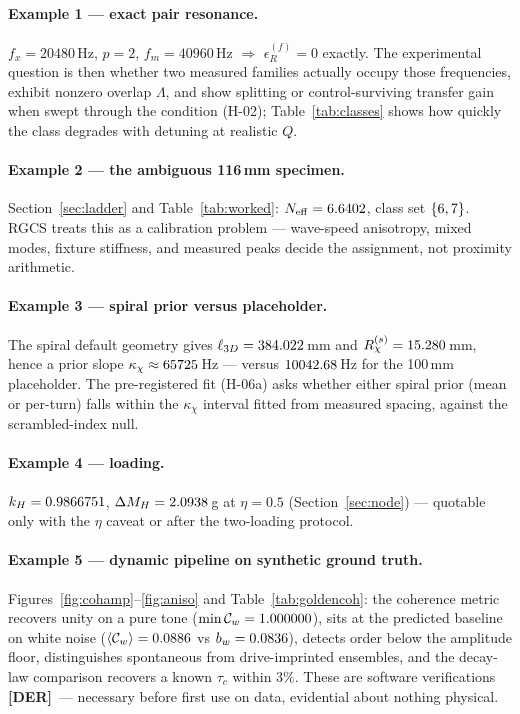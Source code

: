 \documentclass[10pt,letterpaper]{article}
\newcommand{\cltag}[2]{\textcolor{#1}{{\fontspec{TeX Gyre Heros}\scriptsize\bfseries[#2]}}}
\newcommand{\DER}{\cltag{dercol}{DER}}   %
\newcommand{\epsR}{\epsilon_{R}^{(f)}}
\newcommand{\kchi}{\kappa_{\chi}}
\newcommand{\Cw}{\mathcal{C}_{w}}
\begin{document}
\paragraph{Example 1 — exact pair resonance.} $f_x = 20480$\,Hz, $p = 2$,
$f_m = 40960$\,Hz $\Rightarrow$ $\epsR = 0$ exactly. The experimental
question is then whether two measured families actually occupy those
frequencies, exhibit nonzero overlap $\Lambda$, and show splitting or
control-surviving transfer gain when swept through the condition
(H-02); Table~\ref{tab:classes} shows how quickly the class degrades with
detuning at realistic $Q$.

\paragraph{Example 2 — the ambiguous 116\,mm specimen.}
Section~\ref{sec:ladder} and Table~\ref{tab:worked}: $N_{\rm eff} =
6.6402$, class set $\{6, 7\}$. RGCS treats this as
a calibration problem — wave-speed anisotropy, mixed modes, fixture
stiffness, and measured peaks decide the assignment, not proximity
arithmetic.

\paragraph{Example 3 — spiral prior versus placeholder.} The spiral
default geometry gives $\ell_{3D} = 384.022$\,mm and
$R_\chi^{(s)} = 15.280$\,mm, hence a prior slope $\kchi \approx
\gvKappaPrior$\,Hz — versus $10042.68$\,Hz for the 100\,mm placeholder.
The pre-registered fit (H-06a) asks whether either spiral prior (mean or
per-turn) falls within the $\kchi$ interval fitted from measured spacing,
against the scrambled-index null.

\paragraph{Example 4 — loading.} $k_H = 0.9866751$, $\Delta M_H = 2.0938$\,g
at $\eta = 0.5$ (Section~\ref{sec:node}) — quotable only with the $\eta$
caveat or after the two-loading protocol.

\paragraph{Example 5 — dynamic pipeline on synthetic ground truth.}
Figures~\ref{fig:cohamp}--\ref{fig:aniso} and Table~\ref{tab:goldencoh}:
the coherence metric recovers unity on a pure tone
($\min \Cw = \gvCaseBCoh$), sits at the predicted baseline on white noise
($\langle\Cw\rangle = \gvCaseACoh$ vs $b_w = 0.0836$), detects order
below the amplitude floor, distinguishes spontaneous from drive-imprinted
ensembles, and the decay-law comparison recovers a known $\tau_c$ within
$3\%$. These are software verifications \DER\ — necessary before first use
on data, evidential about nothing physical.
\end{document}
